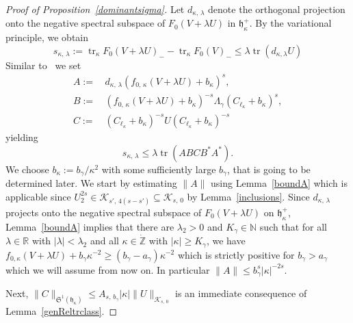 \documentclass[10pt]{amsart}
\theoremstyle{definition}
\DeclareMathOperator{\tr}{tr}
\newcommand*\nz{\mathbb{N}}
\newcommand*\gz{\mathbb{Z}}
\newcommand*\rz{\mathbb{R}}
\newcommand*\zp{\dot{\gz}}
\newcommand*\cK{\mathcal{K}}
\newcommand*\gh{\mathfrak{h}}
\newcommand*\gS{\mathfrak{S}}
\newcommand*\ghpk{{\gh^+_\kappa}}
\begin{document}
\begin{proof}[Proof of Proposition~\ref{dominantsigma}]
Let $d_{\kappa,\,\lambda}$ denote the orthogonal projection onto the negative spectral subspace of $F_0(V+\lambda U)$ in $\ghpk$. By the variational principle, we obtain
\begin{equation}
s_{\kappa,\,\lambda} := \tr_\kappa F_0(V+\lambda U)_- - \tr_\kappa F_0(V)_-
\leq \lambda\tr\left(d_{\kappa,\lambda}U\right)
\end{equation}
Similar to~\cite[Equation~(19)]{Iantchenkoetal1996} we set
\begin{equation}
\begin{split}
A :=\,&d_{\kappa,\,\lambda}\left(f_{0,\,\kappa}\left(V+\lambda U\right)+b_\kappa\right)^s,\\
B :=\,&\left(f_{0,\,\kappa}\left(V+\lambda U\right)+b_\kappa\right)^{-s}\Lambda_\gamma\left(C_{\ell_\kappa}+b_\kappa\right)^s,\\
C :=\,&\left(C_{\ell_\kappa}+b_\kappa\right)^{-s} U \left(C_{\ell_\kappa}+b_\kappa\right)^{-s}
\end{split}
\end{equation}
yielding
\[
s_{\kappa,\,\lambda}\leq\lambda \tr \left(ABCB^*A^*\right).
\]
We choose $ b_\kappa:=b_\gamma/\kappa^2$ with some sufficiently large $b_\gamma$, that is going to be determined later. We start by estimating $\|A\|$ using Lemma~\ref{boundA} which is applicable since $U_2^{2s}\in\cK_{s',\,4(s-s')}\subseteq\cK_{s,\,0}$ by Lemma~\ref{inclusions}. Since $d_{\kappa,\,\lambda}$ projects onto the negative spectral subspace of $F_0(V+\lambda U)$ on $\ghpk$, Lemma~\ref{boundA} implies that there are $\lambda_2>0$ and $K_\gamma\in\nz$ such that for all $\lambda\in\rz$ with $|\lambda|<\lambda_2$ and all $\kappa\in\zp$ with $|\kappa|\geq K_\gamma$, we have $f_{0,\kappa}(V+\lambda U)+b_\gamma\kappa^{-2}\geq(b_\gamma-a_\gamma)
\kappa^{-2}$ which is strictly positive for $b_\gamma>a_\gamma$ which we will assume from now on. In particular $\|A\|\leq b_\gamma^{s} |\kappa|^{-2s}$.

Next, $\|C\|_{\gS^1(\gh_{\kappa})} \leq A_{s,\,b_\gamma}|\kappa|\|U\|_{\cK_{s,\,0}}$ is an immediate consequence of Lemma~\ref{genReltrclass}.


\end{proof}
\end{document}
